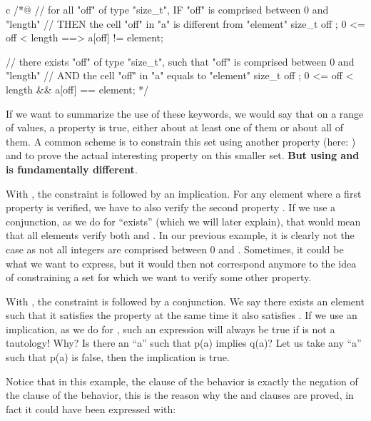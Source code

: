 \begin{CodeBlock}{c}
/*@
// for all "off" of type "size_t", IF "off" is comprised between 0 and "length"
//                                 THEN the cell "off" in "a" is different from "element"
\forall size_t off ; 0 <= off < length ==> a[off] != element;

// there exists "off" of type "size_t", such that "off" is comprised between 0 and "length"
//                                      AND the cell "off" in "a" equals to "element"
\exists size_t off ; 0 <= off < length && a[off] == element;
*/
\end{CodeBlock}


If we want to summarize the use of these keywords, we would say that on a
range of values, a property is true, either about at least one of them
or about all of them. A common scheme is to constrain this set using
another property (here: ) and to prove the
actual interesting property on this smaller set. \textbf{But using
 and  is
fundamentally different}.


With ,
the constraint  is followed by an implication.
For any element where a first property  is verified, we have
to also verify the second property . If we use a conjunction,
as we do for ``exists'' (which we will later explain), that would mean that
all elements verify both  and . In our previous
example, it is clearly not the case as not all integers are comprised between
0 and . Sometimes, it could be what we want to express, but
it would then not correspond anymore to the idea of constraining a set for which
we want to verify some other property.


With , the
constraint  is followed by a conjunction. We say there exists
an element such that it satisfies the property  at the same
time it also satisfies . If we use an implication, as we do
for , such an expression will always be true
if  is not a tautology! Why? Is there an ``a'' such that p(a) implies
q(a)? Let us take any ``a'' such that p(a) is false, then the implication is true.


Notice that in this example, the  clause of the
 behavior is exactly the negation of the 
clause of the  behavior, this is the reason why the
 and  clauses are proved, in fact it
could have been expressed with:


